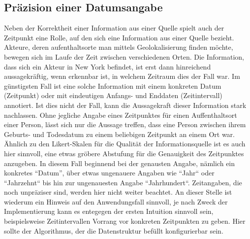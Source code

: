 \subsection{Präzision einer Datumsangabe}
Neben der Korrektheit einer Information aus einer Quelle spielt auch der Zeitpunkt eine Rolle, auf den sich eine Information aus einer Quelle bezieht. Akteure, deren aufenthaltsorte man mittels Geolokalisierung finden möchte, bewegen sich im Laufe der Zeit zwischen verschiedenen Orten. Die Information, dass sich ein Akteur in New York befindet, ist erst dann hinreichend aussagekräftig, wenn erkennbar ist, in welchem Zeitraum dies der Fall war. Im günstigsten Fall ist eine solche Information mit einem konkreten Datum (Zeitpunkt) oder mit eindeutigen Anfangs- und Enddaten (Zeitintervall) annotiert. Ist dies nicht der Fall, kann die Aussagekraft dieser Information stark nachlassen. Ohne jegliche Angabe eines Zeitpunktes für einen Auffenthaltsort einer Person, lässt sich nur die Aussage treffen, dass eine Person zwischen ihrem Geburts- und Todesdatum zu einem beliebigen Zeitpunkt an einem Ort war. Ähnlich zu den Likert-Skalen für die Qualität der Informationsquelle ist es auch hier sinnvoll, eine etwas gröbere Abstufung für die Genauigkeit des Zeitpunktes anzugeben. In diesem Fall beginnend bei der genausten Angabe, nämlich ein konkretes ``Datum'', über etwas ungenauere Angaben wie ``Jahr`` oder ``Jahrzehnt`` bis hin zur ungenauesten Angabe ``Jahrhundert``. Zeitangaben, die noch unpräziser sind, werden hier nicht weiter beachtet. An dieser Stelle ist wiederum ein Hinweis auf den Anwendungsfall sinnvoll, je nach Zweck der Implementierung kann es entegegen der ersten Intuition sinnvoll sein, beispielsweise Zeitintervallen Vorrang vor konkreten Zeitpunkten zu geben. Hier sollte der Algorithmus, der die Datenstruktur befüllt konfigurierbar sein.

